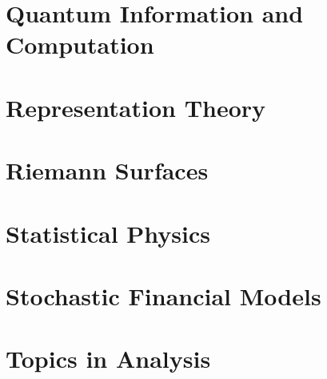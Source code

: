 \chapter{Quantum Information and Computation}
\begingroup
\graphicspath{{../part-ii/quantum-information-and-computation/}}


\endgroup
\chapter{Representation Theory}
\begingroup
\graphicspath{{../part-ii/representation-theory/}}


\endgroup
\chapter{Riemann Surfaces}
\begingroup
\graphicspath{{../part-ii/riemann-surfaces/}}


\endgroup
\chapter{Statistical Physics}
\begingroup
\graphicspath{{../part-ii/statistical-physics/}}


\endgroup
\chapter{Stochastic Financial Models}
\begingroup
\graphicspath{{../part-ii/stochastic-financial-models/}}


\endgroup
\chapter{Topics in Analysis}
\begingroup
\graphicspath{{../part-ii/topics-in-analysis/}}


\endgroup

